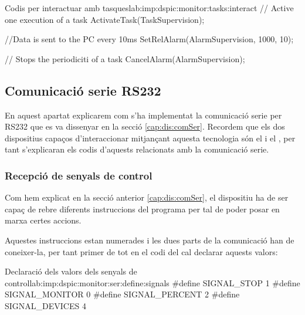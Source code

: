 \begin{code_c}{Codis per interactuar amb tasques}{lab:imp:dspic:monitor:tasks:interact}
// Active one execution of a task
ActivateTask(TaskSupervision);

//Data is sent to the PC every 10ms
SetRelAlarm(AlarmSupervision, 1000, 10);

// Stops the periodiciti of a task
CancelAlarm(AlarmSupervision);
\end{code_c}


\subsection{Comunicació serie RS232}\label{lab:imp:dspic:monitor:serie}

En aquest apartat explicarem com s'ha implementat la comunicació serie per RS232 que es va dissenyar en la secció \ref{cap:dis:comSer}. Recordem que els dos dispositius capaços d'interaccionar mitjançant aquesta tecnologia són el \Monitor i el \SensorActuador, per tant s'explicaran els codis d'aquests relacionats amb la comunicació serie.

\subsubsection{Recepció de senyals de control}\label{lab:imp:dspic:monitor:ser:rec}

Com hem explicat en la secció anterior \ref{cap:dis:comSer}, el dispositiu \Monitor ha de ser capaç de rebre diferents instruccions del programa \DCSMonitor per tal de poder posar en marxa certes accions.

Aquestes instruccions estan numerades i les dues parts de la comunicació han de coneixer-la, per tant primer de tot en el codi del \Monitor cal declarar aquests valors:

\begin{code_c}{Declaració dels valors dels senyals de control}{lab:imp:dspic:monitor:ser:define:signals}
#define SIGNAL_STOP			1
#define SIGNAL_MONITOR		0
#define SIGNAL_PERCENT		2
#define SIGNAL_DEVICES		4
\end{code_c}

